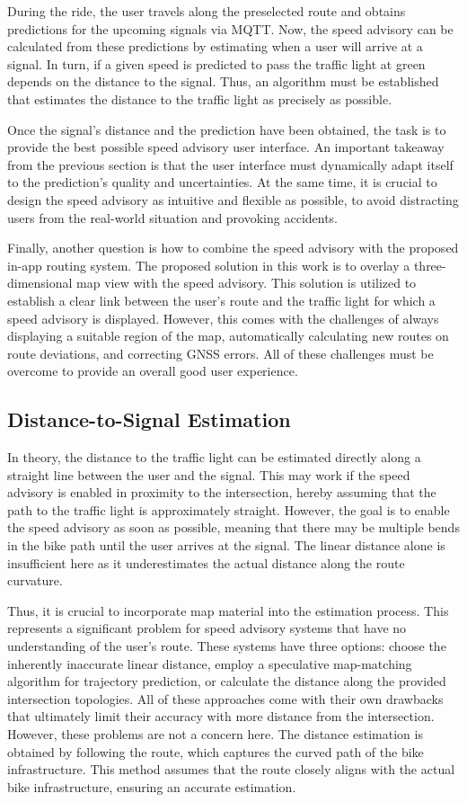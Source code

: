 During the ride, the user travels along the preselected route and obtains predictions for the upcoming signals via MQTT. Now, the speed advisory can be calculated from these predictions by estimating when a user will arrive at a signal. In turn, if a given speed is predicted to pass the traffic light at green depends on the distance to the signal. Thus, an algorithm must be established that estimates the distance to the traffic light as precisely as possible.

Once the signal's distance and the prediction have been obtained, the task is to provide the best possible speed advisory user interface. An important takeaway from the previous section is that the user interface must dynamically adapt itself to the prediction's quality and uncertainties. At the same time, it is crucial to design the speed advisory as intuitive and flexible as possible, to avoid distracting users from the real-world situation and provoking accidents.

Finally, another question is how to combine the speed advisory with the proposed in-app routing system. The proposed solution in this work is to overlay a three-dimensional map view with the speed advisory. This solution is utilized to establish a clear link between the user's route and the traffic light for which a speed advisory is displayed. However, this comes with the challenges of always displaying a suitable region of the map, automatically calculating new routes on route deviations, and correcting GNSS errors. All of these challenges must be overcome to provide an overall good user experience.

\subsection{Distance-to-Signal Estimation}

In theory, the distance to the traffic light can be estimated directly along a straight line between the user and the signal. This may work if the speed advisory is enabled in proximity to the intersection, hereby assuming that the path to the traffic light is approximately straight. However, the goal is to enable the speed advisory as soon as possible, meaning that there may be multiple bends in the bike path until the user arrives at the signal. The linear distance alone is insufficient here as it underestimates the actual distance along the route curvature. 

Thus, it is crucial to incorporate map material into the estimation process. This represents a significant problem for speed advisory systems that have no understanding of the user's route. These systems have three options: choose the inherently inaccurate linear distance, employ a speculative map-matching algorithm for trajectory prediction, or calculate the distance along the provided intersection topologies. All of these approaches come with their own drawbacks that ultimately limit their accuracy with more distance from the intersection. However, these problems are not a concern here. The distance estimation is obtained by following the route, which captures the curved path of the bike infrastructure. This method assumes that the route closely aligns with the actual bike infrastructure, ensuring an accurate estimation.


